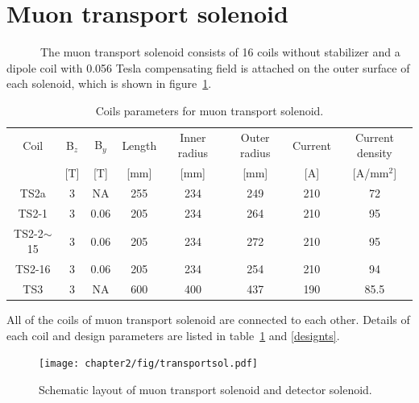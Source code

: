  \section{Muon transport solenoid}
~~~~~~The muon transport solenoid consists of 16 coils without stabilizer and a dipole coil with 0.056 Tesla compensating field is attached on the outer surface of each solenoid, which is shown in figure~\ref{transol}.
\begin{table}[H]
 \centering
 \begin{tabular}{cccccccc} \hline \hline
  Coil & B$_z$ & B$_y$ & Length & Inner radius & Outer radius & Current & Current density \\
   & [T] & [T] & [mm] & [mm] & [mm] & [A] & [A/mm$^2$] \\ \hline
  TS2a & 3 & NA & 255 & 234 & 249 & 210 & 72 \\
  TS2-1 & 3 & 0.06 & 205 & 234 & 264 & 210 & 95 \\
  TS2-2$\sim$15 & 3 & 0.06 & 205 & 234 & 272 & 210 & 95 \\
  TS2-16 & 3 & 0.06 & 205 & 234 & 254 & 210 & 94 \\
  TS3 & 3 & NA & 600 & 400 & 437 & 190 & 85.5 \\ \hline \hline
 \end{tabular}
 \caption{Coils parameters for muon transport solenoid.}
 \label{tscoil}
\end{table}
All of the coils of muon transport solenoid are connected to each other.
Details of each coil and design parameters are listed in table~\ref{tscoil} and \ref{designts}.
\begin{figure}[H]
 \centering
 \texttt{[image: chapter2/fig/transportsol.pdf]}
 \caption{Schematic layout of muon transport solenoid and detector solenoid.}
 \label{transol}
\end{figure}


